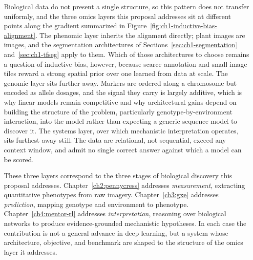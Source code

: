Biological data do not present a single structure, so this pattern does not transfer uniformly, and the three omics layers this proposal addresses sit at different points along the gradient summarized in Figure~\ref{fig:ch1-inductive-bias-alignment}. The phenomic layer inherits the alignment directly; plant images are images, and the segmentation architectures of Sections~\ref{sec:ch1-segmentation} and~\ref{sec:ch1-tfseg} apply to them. Which of those architectures to choose remains a question of inductive bias, however, because scarce annotation and small image tiles reward a strong spatial prior over one learned from data at scale. The genomic layer sits further away. Markers are ordered along a chromosome but encoded as allele dosages, and the signal they carry is largely additive, which is why linear models remain competitive and why architectural gains depend on building the structure of the problem, particularly genotype-by-environment interaction, into the model rather than expecting a generic sequence model to discover it. The systems layer, over which mechanistic interpretation operates, sits furthest away still. The data are relational, not sequential, exceed any context window, and admit no single correct answer against which a model can be scored.

These three layers correspond to the three stages of biological discovery this proposal addresses. Chapter~\ref{ch2:pennycress} addresses \textit{measurement}, extracting quantitative phenotypes from raw imagery. Chapter~\ref{ch3:gxe} addresses \textit{prediction}, mapping genotype and environment to phenotype. Chapter~\ref{ch4:mentor-rl} addresses \textit{interpretation}, reasoning over biological networks to produce evidence-grounded mechanistic hypotheses. In each case the contribution is not a general advance in deep learning, but a system whose architecture, objective, and benchmark are shaped to the structure of the omics layer it addresses.
